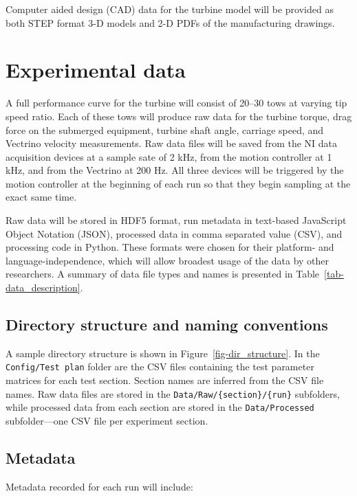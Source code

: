\documentclass[12pt,letterpaper]{scrreprt}
\begin{document}
Computer aided design (CAD) data for the turbine model will be provided as both
STEP format 3-D models and 2-D PDFs of the manufacturing drawings.

\section{Experimental data}

A full performance curve for the turbine will consist of 20--30 tows at varying
tip speed ratio. Each of these tows will produce raw data for the turbine
torque, drag force on the submerged equipment, turbine shaft angle, carriage
speed, and Vectrino velocity measurements. Raw data files will be saved from the
NI data acquisition devices at a sample sate of 2 kHz, from the motion
controller at 1 kHz, and from the Vectrino at 200 Hz. All three devices will be
triggered by the motion controller at the beginning of each run so that they
begin sampling at the exact same time.

Raw data will be stored in HDF5 format, run metadata in text-based JavaScript
Object Notation (JSON), processed data in comma separated value (CSV), and
processing code in Python. These formats were chosen for their platform- and
language-independence, which will allow broadest usage of the data by other
researchers. A summary of data file types and names is presented in
Table~\ref{tab-data_description}.


\subsection{Directory structure and naming conventions}

A sample directory structure is shown in Figure~\ref{fig-dir_structure}. In the
\texttt{Config/Test plan} folder are the CSV files containing the test parameter
matrices for each test section. Section names are inferred from the CSV file
names. Raw data files are stored in the \texttt{Data/Raw/\{section\}/\{run\}}
subfolders, while processed data from each section are stored in the
\texttt{Data/Processed} subfolder---one CSV file per experiment section.

\subsection{Metadata}

Metadata recorded for each run will include:
\end{document}
